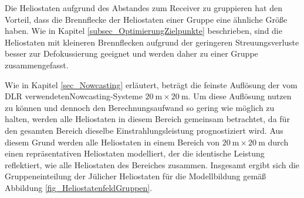 Die Heliostaten aufgrund des Abstandes zum Receiver zu gruppieren hat den Vorteil, dass die Brennflecke der Heliostaten einer Gruppe eine ähnliche Größe haben.
Wie in Kapitel \ref{subsec_OptimierungZielpunkte} beschrieben, sind die Heliostaten mit kleineren Brennflecken aufgrund der geringeren Streuungsverluste besser zur Defokussierung geeignet und werden daher zu einer Gruppe zusammengefasst.

Wie in Kapitel \ref{sec_Nowcasting} erläutert, beträgt die feinste Auflösung der vom DLR verwendeten\linebreak Nowcasting-Systeme $\SI{20}{\metre} \times \SI{20}{\metre}$.
Um diese Auflösung nutzen zu können und dennoch den Berechnungsaufwand so gering wie möglich zu halten, werden alle Heliostaten in diesem Bereich gemeinsam betrachtet, da für den gesamten Bereich dieselbe Einstrahlungsleistung prognostiziert wird.
Aus diesem Grund werden alle Heliostaten in einem Bereich von $\SI{20}{\metre} \times \SI{20}{\metre}$ durch einen repräsentativen Heliostaten modelliert, der die identische Leistung reflektiert, wie alle Heliostaten des Bereiches zusammen.
Insgesamt ergibt sich die Gruppeneinteilung der Jülicher Heliostaten für die Modellbildung gemäß Abbildung \ref{fig_HeliostatenfeldGruppen}.

